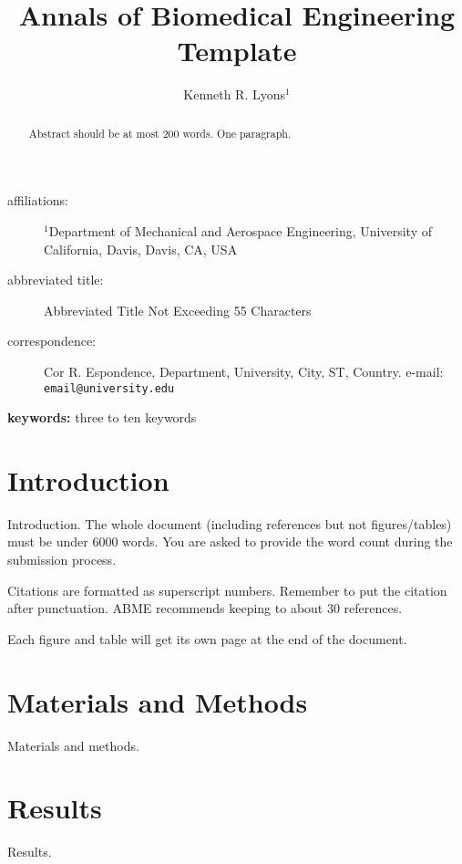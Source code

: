 \documentclass[12pt]{article}
\begin{document}
\title{
    Annals of Biomedical Engineering Template
}
\author{
    Kenneth R. Lyons$^1$
}
\date{}

\maketitle

\begin{description}
    \item[affiliations:]
        $^1$Department of Mechanical and Aerospace Engineering,
        University of California, Davis, Davis, CA, USA
    \item[abbreviated title:]
        Abbreviated Title Not Exceeding 55 Characters
    \item[correspondence:]
        Cor R. Espondence,
        Department, University, City, ST, Country.
        e-mail: \texttt{email@university.edu}
\end{description}

\newpage

\begin{abstract}
Abstract should be at most 200 words. One paragraph.
\end{abstract}

\textbf{keywords:} three to ten keywords

\newpage

\section{Introduction}
\label{sec:introduction}

Introduction. The whole document (including references but not figures/tables)
must be under 6000 words. You are asked to provide the word count during the
submission process.

Citations are formatted as superscript numbers. \cite{journalpaper} Remember to
put the citation after punctuation. \cite{book} ABME recommends keeping to
about 30 references.

Each figure and table will get its own page at the end of the document.

\section{Materials and Methods}
\label{sec:methods}
Materials and methods.

\section{Results}
\label{sec:results}
Results.
\end{document}
